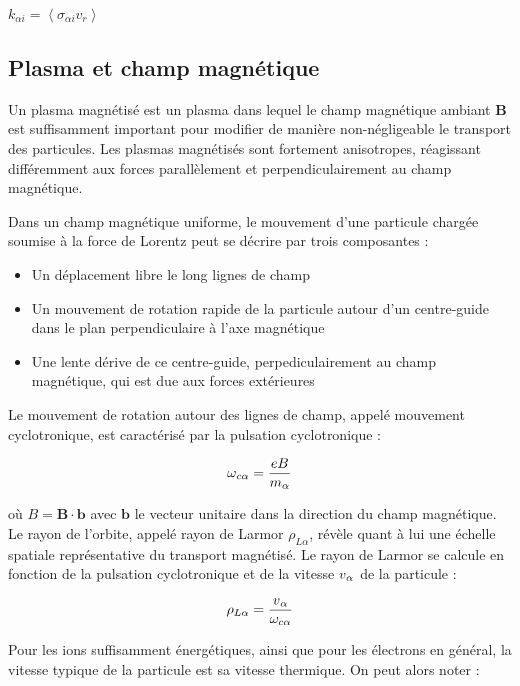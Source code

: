 \begin{refsection}
$k_{\alpha i}=\left<\sigma_{\alpha i} v_r\right>$
\subsection{Plasma et champ magnétique} 
\label{1-plasma-champMag}
Un plasma magnétisé est un plasma dans lequel le champ magnétique ambiant
$\mathbf{B}$ est suffisamment important pour modifier de manière
non-négligeable le transport des particules. Les plasmas magnétisés sont fortement
anisotropes, réagissant différemment aux forces parallèlement et
perpendiculairement au champ magnétique.

Dans un champ magnétique uniforme, le
mouvement d'une particule chargée soumise à la force de Lorentz peut se décrire
par trois composantes :

\begin{itemize}
  \item Un déplacement libre le long lignes de champ
  \item Un mouvement de rotation rapide de la particule
  autour d'un centre-guide dans le plan perpendiculaire à l'axe magnétique
  \item Une lente dérive de ce centre-guide, perpediculairement au champ
  magnétique, qui est due aux forces extérieures
\end{itemize}

Le mouvement de rotation autour des lignes de champ, appelé mouvement
cyclotronique, est caractérisé par la pulsation cyclotronique : 

\begin{equation}
\omega{_{{c\alpha}}}=\frac{e B}{m_\alpha}
\end{equation}

où $B=\mathbf B\cdot\mathbf b$ avec $\mathbf b$ le vecteur unitaire dans la
direction du champ magnétique. Le rayon de l'orbite, appelé rayon de Larmor
$\rho_{L\alpha}$, révèle quant à lui une échelle spatiale représentative du transport magnétisé.
Le rayon de Larmor se calcule en fonction de la pulsation cyclotronique et de la vitesse
$v{_{\alpha}}$ de la particule :

\begin{equation}
\rho_{L \alpha}
=\frac{v{_{\alpha}}}{\omega_{c{\alpha}}}
\end{equation}

Pour les ions suffisamment énergétiques, ainsi que pour les électrons en général,
la vitesse typique de la particule est sa vitesse thermique. On peut alors noter :


\end{refsection}
